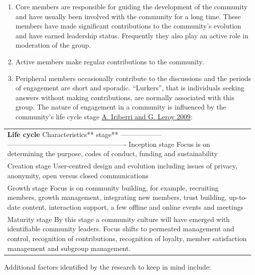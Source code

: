 \documentclass[
  letterpaper,
  DIV=11,
  numbers=noendperiod]{scrreprt}
\providecommand{\tightlist}{%
  \setlength{\itemsep}{0pt}\setlength{\parskip}{0pt}}\usepackage{longtable,booktabs,array}
\begin{document}
\begin{enumerate}
\def\labelenumi{\arabic{enumi}.}
\tightlist
\item
  Core members are responsible for guiding the development of the
  community and have usually been involved with the community for a long
  time. These members have made significant contributions to the
  community's evolution and have earned leadership status. Frequently
  they also play an active role in moderation of the group.
\item
  Active members make regular contributions to the community.
\item
  Peripheral members occasionally contribute to the discussions and the
  periods of engagement are short and sporadic. ``Lurkers'', that is
  individuals seeking answers without making contributions, are normally
  associated with this group. The nature of engagement in a community is
  influenced by the community's life cycle stage
  \href{https://twu.idm.oclc.org/login?url=https://search.ebscohost.com/login.aspx?direct=true&db=edscma&AN=edscma.1459356&site=eds-live&scope=site}{A.
  Iriberri and G. Leroy 2009}:
\end{enumerate}

\begin{longtable}[]{@{}
  >{\raggedright\arraybackslash}p{}@{}}
\toprule\noalign{}
\endhead
\bottomrule\noalign{}
\endlastfoot
\textbf{Life cycle }Characteristics** stage** ------------------
---------------------------------------------------- Inception stage
Focus is on determining the purpose, codes of conduct, funding and
sustainability \\
Creation stage User-centred design and evolution including issues of
privacy, anonymity, open versus closed communications \\
Growth stage Focus is on community building, for example, recruiting
members, growth management, integrating new members, trust building,
up-to-date content, interaction support, a few offline and online events
and meetings \\
Maturity stage By this stage a community culture will have emerged with
identifiable community leaders. Focus shifts to permeated management and
control, recognition of contributions, recognition of loyalty, member
satisfaction management and subgroup management. \\
\end{longtable}

Additional factors identified by the research to keep in mind include:
\end{document}
